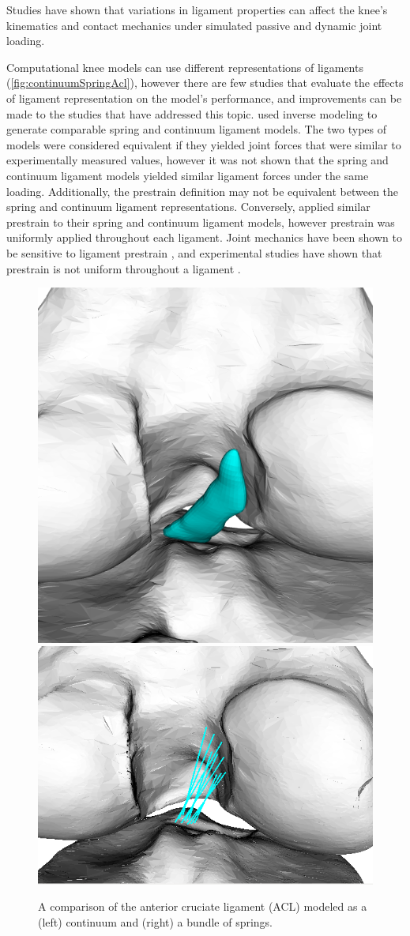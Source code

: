 Studies have shown that variations in ligament properties can affect the knee's kinematics and contact mechanics under simulated passive \citep{baldwin_efficient_2009,dhaher_effect_2010} and dynamic \citep{smith_influence_2016-1} joint loading.


Computational knee models can use different representations of ligaments (\autoref{fig:continuumSpringAcl}), however there are few studies that evaluate the effects of ligament representation on the model's performance, and improvements can be made to the studies that have addressed this topic. \cite{beidokhti_influence_2017} used inverse modeling to generate comparable spring and continuum ligament models. The two types of models were considered equivalent if they yielded joint forces that were similar to experimentally measured values, however it was not shown that the spring and continuum ligament models yielded similar ligament forces under the same loading. Additionally, the prestrain definition may not be equivalent between the spring and continuum ligament representations. Conversely, \cite{orozco_effect_2018} applied similar prestrain to their spring and continuum ligament models, however prestrain was uniformly applied throughout each ligament. Joint mechanics have been shown to be sensitive to ligament prestrain \citep{baldwin_efficient_2009}, and experimental studies have shown that prestrain is not uniform throughout a ligament \citep{hull_strain_1996,gardiner_strain_2001}.

\begin{figure}
    \centering
    \includegraphics[width=0.35\linewidth]{../img/Knee_ACL_Close.png}
    \includegraphics[width=0.35\linewidth]{../img/Knee_ACL_Springs_Close.png}
    \caption{A comparison of the anterior cruciate ligament (ACL) modeled as a (left) continuum and (right) a bundle of springs.}
    \label{fig:continuumSpringAcl}
\end{figure}

